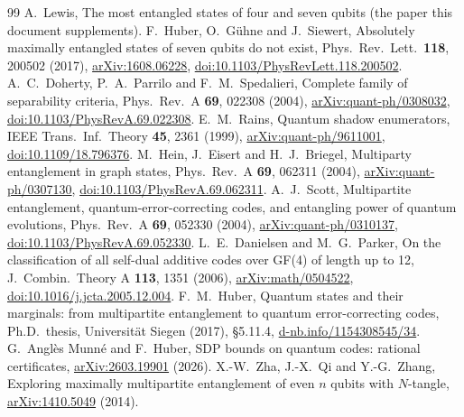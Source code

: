 \documentclass[11pt]{article}
\numberwithin{equation}{section}
\begin{document}
\begin{thebibliography}{99}
 A.~Lewis, The most entangled states of four and seven qubits (the paper
this document supplements).
 F.~Huber, O.~G\"uhne and J.~Siewert, Absolutely maximally entangled states of seven
qubits do not exist, Phys.\ Rev.\ Lett.\ \textbf{118}, 200502 (2017),
\href{https://arxiv.org/abs/1608.06228}{arXiv:1608.06228}, \href{https://doi.org/10.1103/PhysRevLett.118.200502}{doi:10.1103/PhysRevLett.118.200502}.
 A.~C.~Doherty, P.~A.~Parrilo and F.~M.~Spedalieri, Complete family of separability criteria,
Phys.\ Rev.\ A \textbf{69}, 022308 (2004), \href{https://arxiv.org/abs/quant-ph/0308032}{arXiv:quant-ph/0308032}, \href{https://doi.org/10.1103/PhysRevA.69.022308}{doi:10.1103/PhysRevA.69.022308}.
 E.~M.~Rains, Quantum shadow enumerators, IEEE Trans.\ Inf.\ Theory \textbf{45}, 2361
(1999), \href{https://arxiv.org/abs/quant-ph/9611001}{arXiv:quant-ph/9611001}, \href{https://doi.org/10.1109/18.796376}{doi:10.1109/18.796376}.
 M.~Hein, J.~Eisert and H.~J.~Briegel, Multiparty entanglement in graph states, Phys.\
Rev.\ A \textbf{69}, 062311 (2004), \href{https://arxiv.org/abs/quant-ph/0307130}{arXiv:quant-ph/0307130}, \href{https://doi.org/10.1103/PhysRevA.69.062311}{doi:10.1103/PhysRevA.69.062311}.
\bibitem{Scott} A.~J.~Scott, Multipartite entanglement, quantum-error-correcting codes, and entangling power of
quantum evolutions, Phys.\ Rev.\ A \textbf{69}, 052330 (2004),
\href{https://arxiv.org/abs/quant-ph/0310137}{arXiv:quant-ph/0310137}, \href{https://doi.org/10.1103/PhysRevA.69.052330}{doi:10.1103/PhysRevA.69.052330}.
\bibitem{DP} L.~E.~Danielsen and M.~G.~Parker, On the classification of all self-dual additive codes over GF(4)
of length up to 12, J.\ Combin.\ Theory A \textbf{113}, 1351 (2006),
\href{https://arxiv.org/abs/math/0504522}{arXiv:math/0504522}, \href{https://doi.org/10.1016/j.jcta.2005.12.004}{doi:10.1016/j.jcta.2005.12.004}.
\bibitem{HuberThesis17} F.~M.~Huber, Quantum states and their marginals: from multipartite entanglement to quantum
error-correcting codes, Ph.D.\ thesis, Universit\"at Siegen (2017), \S5.11.4,
\href{https://d-nb.info/1154308545/34}{d-nb.info/1154308545/34}.
\bibitem{AMH26} G.~Angl\`es Munn\'e and F.~Huber, SDP bounds on quantum codes: rational certificates,
\href{https://arxiv.org/abs/2603.19901}{arXiv:2603.19901} (2026).
\bibitem{Zha14} X.-W.~Zha, J.-X.~Qi and Y.-G.~Zhang, Exploring maximally multipartite entanglement of even $n$ qubits
with $N$-tangle, \href{https://arxiv.org/abs/1410.5049}{arXiv:1410.5049} (2014).

\end{thebibliography}
\end{document}
